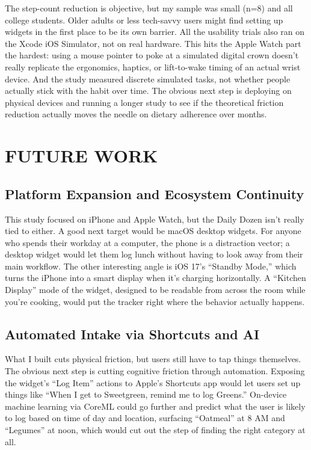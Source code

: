 \documentclass[10pt,twocolumn]{article}
\begin{document}
The step-count reduction is objective, but my sample was small (n=8) and all college students. Older adults or less tech-savvy users might find setting up widgets in the first place to be its own barrier. All the usability trials also ran on the Xcode iOS Simulator, not on real hardware. This hits the Apple Watch part the hardest: using a mouse pointer to poke at a simulated digital crown doesn't really replicate the ergonomics, haptics, or lift-to-wake timing of an actual wrist device. And the study measured discrete simulated tasks, not whether people actually stick with the habit over time. The obvious next step is deploying on physical devices and running a longer study to see if the theoretical friction reduction actually moves the needle on dietary adherence over months.

\section{FUTURE WORK}

\subsection{Platform Expansion and Ecosystem Continuity}

This study focused on iPhone and Apple Watch, but the Daily Dozen isn't really tied to either.\cite{GregerHowNotToDie} A good next target would be macOS desktop widgets.\cite{AppleHIGWidgets} For anyone who spends their workday at a computer, the phone is a distraction vector; a desktop widget would let them log lunch without having to look away from their main workflow. The other interesting angle is iOS 17's ``Standby Mode,'' which turns the iPhone into a smart display when it's charging horizontally. A ``Kitchen Display'' mode of the widget, designed to be readable from across the room while you're cooking, would put the tracker right where the behavior actually happens.

\subsection{Automated Intake via Shortcuts and AI}

What I built cuts physical friction, but users still have to tap things themselves. The obvious next step is cutting cognitive friction through automation. Exposing the widget's ``Log Item'' actions to Apple's Shortcuts app would let users set up things like ``When I get to Sweetgreen, remind me to log Greens.'' On-device machine learning via CoreML could go further and predict what the user is likely to log based on time of day and location, surfacing ``Oatmeal'' at 8 AM and ``Legumes'' at noon, which would cut out the step of finding the right category at all.
\end{document}
